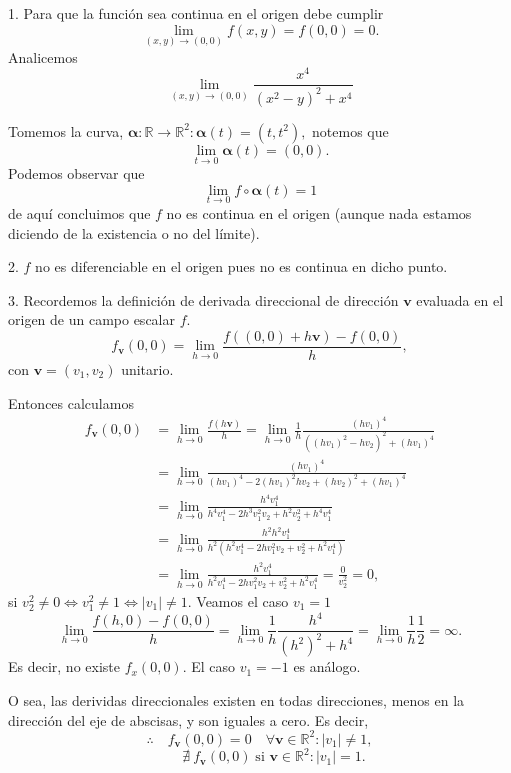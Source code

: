 \begin{solution}
    1. Para que la función sea continua en el origen  debe cumplir
    \[
        \lim_{(x,y)\to(0,0)} f(x,y) = f(0,0) =0.
    \]
    Analicemos
    \[
        \lim_{(x,y)\to(0,0)} \frac{x^4}{(x^2-y)^2+x^4}
    \]

    Tomemos  la curva,  $\boldsymbol{\alpha}:\mathbb{R}\to\mathbb{R}^2:  \boldsymbol{\alpha}(t)=(t,t^2),$ notemos que  $$\lim_{t\to0}\boldsymbol{\alpha}(t)=(0,0).$$   Podemos observar que $$ \lim_{t\to0} f\circ\boldsymbol{\alpha}(t) = 1$$  de aqu\'i concluimos que $f$ no es continua en el origen (aunque nada estamos diciendo de la existencia o no del l\'imite).

    2. $f$ no es diferenciable en el origen pues no es continua en dicho punto.

    3. Recordemos la definici\'on de derivada direccional de direcci\'on ${\mathbf{v}}$ evaluada en el origen de un campo escalar $f$.
    \[
        f_{{\mathbf{v}}}(0,0)=\lim_{h\to0}\frac{f((0,0)+h{\mathbf{v}})-f(0,0)}{h},
    \]
    con  ${\mathbf{v}}=(v_1,v_2)$ unitario.

    Entonces calculamos
    \begin{align*}
        f_{{\mathbf{v}}}(0,0) & =\lim_{h\to0}\frac{f(h{\mathbf{v}})}{h}=\lim_{h\to0}\frac{1}{h}\frac{(hv_1)^4}{((hv_1)^2-hv_2)^2+(hv_1)^4} \\[.2cm]
                              & =\lim_{h\to0}\frac{(hv_1)^4}{(hv_1)^4-2(hv_1)^2hv_2+(hv_2)^2+(hv_1)^4}                                     \\[.2cm]
                              & =\lim_{h\to0}\frac{h^4v_1^4}{h^4v_1^4-2h^3v_1^2v_2+h^2v_2^2+h^4v_1^4}                                      \\[.2cm]
                              & =\lim_{h\to0}\frac{h^2h^2v_1^4}{h^2(h^2v_1^4-2hv_1^2v_2+v_2^2+h^2v_1^4)}                                   \\[.2cm]
                              & =\lim_{h\to0}\frac{h^2v_1^4}{h^2v_1^4-2hv_1^2v_2+v_2^2+h^2v_1^4}=\frac{0}{v_2^2}=0,
    \end{align*}
    si $v_2^2 \neq 0 \iff v_1^2 \neq 1 \iff |v_1| \neq 1$.  Veamos el caso  $v_1 = 1$
    $$  \lim_{h\to0} \frac{f(h,0)-f(0,0)}{h} = \lim_{h\to0} \frac{1}{h}\frac{h^4}{(h^2)^2+h^4}=\lim_{h\to0}\frac{1}{h}\frac{1}{2}=\infty.$$ Es decir, no existe $f_x(0,0)$.  El caso  $v_1 = -1$ es an\'alogo.


    O sea, las derividas direccionales existen en todas direcciones, menos en la dirección del eje de abscisas, y son iguales a cero. Es decir,
    \[  \therefore\quad f_{{\mathbf{v}}}(0,0)=0\quad\forall{\mathbf{v}}\in\mathbb{R}^2: |v_1| \neq1,  \]
    \[ \quad  \quad   \nexists \:f_{{\mathbf{v}}}(0,0) \;\mbox{si }{\mathbf{v}}\in\mathbb{R}^2: |v_1| = 1. \]



\end{solution}

